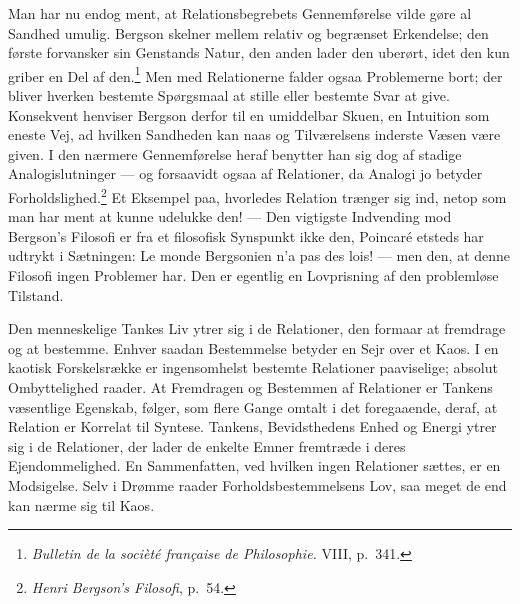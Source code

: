 \documentclass[12pt]{article}
\newcommand{\opage}[1]{\marginnote{\footnotesize\textit{[#1]}}}
\begin{document}
Man har nu endog ment, at Relationsbegrebets Gennemførelse vilde gøre al
Sandhed umulig. Bergson skelner mellem relativ og begrænset Erkendelse; den
første forvansker sin Genstands Natur, den anden lader den uberørt, idet
den kun griber en Del af den.\footnote{\textit{Bulletin de la socièté
française de Philosophie.} VIII, p.~341.}
Men med Relationerne falder ogsaa Problemerne bort; der bliver hverken
bestemte Spørgsmaal at stille eller bestemte Svar at give. Konsekvent
henviser Bergson derfor til en umiddelbar Skuen, en Intuition som eneste
Vej, ad hvilken Sandheden kan naas og Tilværelsens inderste Væsen være
given. I den nærmere Gennemførelse heraf benytter han sig dog af stadige
Analogislutninger --- og forsaavidt ogsaa af Relationer, da Analogi jo
betyder Forholdslighed.\footnote{\textit{Henri Bergson's Filosofi},
p.~54.} Et Eksempel paa, hvorledes Relation trænger sig ind, netop som man
har ment at kunne udelukke den! --- Den vigtigste Indvending mod Bergson's
Filosofi er fra et filosofisk Synspunkt ikke den, Poincaré etsteds har
udtrykt i Sætningen: Le monde Bergsonien n'a pas des lois! --- men den, at
denne Filosofi ingen Problemer har. Den er egentlig en Lovprisning af den
problemløse Tilstand.

\opage{102} Den menneskelige Tankes Liv ytrer sig i de Relationer, den formaar at
fremdrage og at bestemme. Enhver saadan Bestemmelse betyder en Sejr over et
Kaos. I en kaotisk Forskelsrække er ingensomhelst bestemte Relationer
paaviselige; absolut Ombyttelighed raader. At Fremdragen og Bestemmen af
Relationer er Tankens væsentlige Egenskab, følger, som flere Gange omtalt i
det foregaaende, deraf, at Relation er Korrelat til Syntese. Tankens,
Bevidsthedens Enhed og Energi ytrer sig i de Relationer, der lader de
enkelte Emner fremtræde i deres Ejendommelighed. En Sammenfatten, ved
hvilken ingen Relationer sættes, er en Modsigelse. Selv i Drømme raader
Forholdsbestemmelsens Lov, saa meget de end kan nærme sig til Kaos.
\end{document}
